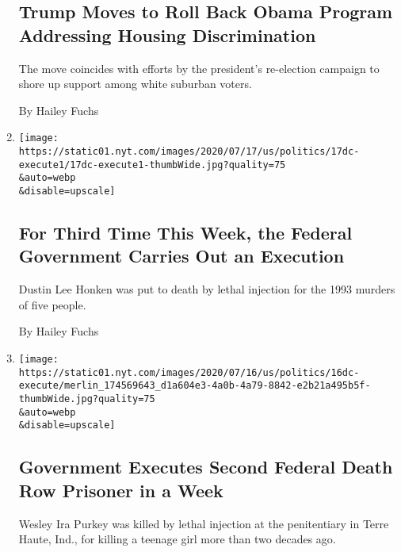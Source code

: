 \begin{enumerate}
  \hypertarget{trump-moves-to-roll-back-obama-program-addressing-housing-discrimination}{%
  \subsection{Trump Moves to Roll Back Obama Program Addressing Housing
  Discrimination}\label{trump-moves-to-roll-back-obama-program-addressing-housing-discrimination}}

  The move coincides with efforts by the president's re-election
  campaign to shore up support among white suburban voters.

  By Hailey Fuchs
\item
  \href{/2020/07/17/us/dustin-honken-federal-execution.html}{}

  \texttt{[image: https://static01.nyt.com/images/2020/07/17/us/politics/17dc-execute1/17dc-execute1-thumbWide.jpg?quality=75\\\&auto=webp\\\&disable=upscale]}

  \hypertarget{for-third-time-this-week-the-federal-government-carries-out-an-execution}{%
  \subsection{For Third Time This Week, the Federal Government Carries
  Out an
  Execution}\label{for-third-time-this-week-the-federal-government-carries-out-an-execution}}

  Dustin Lee Honken was put to death by lethal injection for the 1993
  murders of five people.

  By Hailey Fuchs
\item
  \href{/2020/07/16/us/politics/wesley-ira-purkey-executed.html}{}

  \texttt{[image: https://static01.nyt.com/images/2020/07/16/us/politics/16dc-execute/merlin\_174569643\_d1a604e3-4a0b-4a79-8842-e2b21a495b5f-thumbWide.jpg?quality=75\\\&auto=webp\\\&disable=upscale]}

  \hypertarget{government-executes-second-federal-death-row-prisoner-in-a-week}{%
  \subsection{Government Executes Second Federal Death Row Prisoner in a
  Week}\label{government-executes-second-federal-death-row-prisoner-in-a-week}}

  Wesley Ira Purkey was killed by lethal injection at the penitentiary
  in Terre Haute, Ind., for killing a teenage girl more than two decades
  ago.


\end{enumerate}
